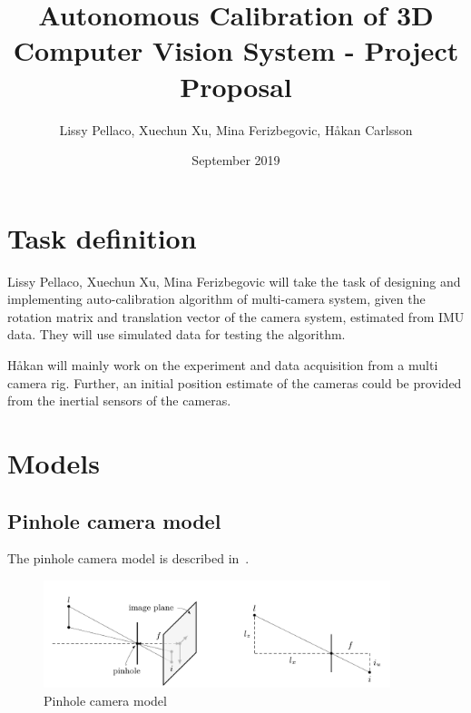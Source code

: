 \documentclass[12pt]{extarticle}
\title{Autonomous Calibration of 3D Computer Vision System - Project Proposal}
\author{Lissy Pellaco, Xuechun Xu, Mina Ferizbegovic, Håkan Carlsson}
\date{September 2019}
\begin{document}
\maketitle

\section{Task definition}
Lissy Pellaco, Xuechun Xu, Mina Ferizbegovic will take the task of
designing and implementing auto-calibration algorithm of multi-camera
system, given the rotation matrix and translation vector of the camera
system, estimated from IMU data. They will use simulated data for
testing the algorithm.

H\aa kan will mainly work on the experiment and data acquisition from
a multi camera rig. Further, an initial position estimate of the
cameras could be provided from the inertial sensors of the cameras.

\section{Models}

\subsection{Pinhole camera model}
\label{sec:pinhole}

The pinhole camera model is described in~\cite{Kok2017b}.

\begin{figure}[t]
  \centering
  \includegraphics[width=0.9\textwidth]{figs/pinhole_camera.png}
  \caption{Pinhole camera model}
  \label{fig:pinhole_camera}
\end{figure}
\end{document}
